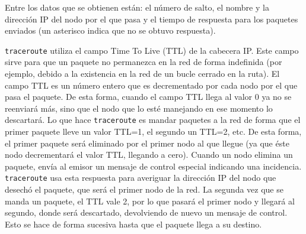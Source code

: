 \vspace*{5 mm}

Entre los datos que se obtienen están: el número de salto, el nombre y la dirección IP del nodo por el que pasa y el tiempo de respuesta para los paquetes enviados (un asterisco indica que no se obtuvo respuesta).

\texttt{traceroute} utiliza el campo Time To Live (TTL) de la cabecera IP. Este campo sirve para que un paquete no permanezca en la red de forma indefinida (por ejemplo, debido a la existencia en la red de un bucle cerrado en la ruta). El campo TTL es un número entero que es decrementado por cada nodo por el que pasa el paquete. De esta forma, cuando el campo TTL llega al valor 0 ya no se reenviará más, sino que el nodo que lo esté manejando en ese momento lo descartará. Lo que hace \texttt{traceroute} es mandar paquetes a la red de forma que el primer paquete lleve un valor TTL=1, el segundo un TTL=2, etc. De esta forma, el primer paquete será eliminado por el primer nodo al que llegue (ya que éste nodo decrementará el valor TTL, llegando a cero). Cuando un nodo elimina un paquete, envía al emisor un mensaje de control especial indicando una incidencia. \texttt{traceroute} usa esta respuesta para averiguar la dirección IP del nodo que desechó el paquete, que será el primer nodo de la red. La segunda vez que se manda un paquete, el TTL vale 2, por lo que pasará el primer nodo y llegará al segundo, donde será descartado, devolviendo de nuevo un mensaje de control. Esto se hace de forma sucesiva hasta que el paquete llega a su destino.
